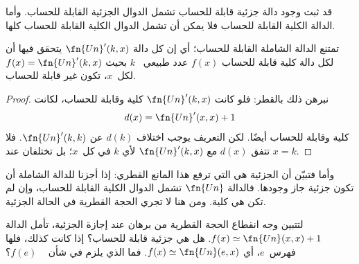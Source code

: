 \documentclass[../../../include/open-logic-section]{subfiles}
\begin{document}

قد ثبت وجود دالة جزئية قابلة للحساب تشمل الدوال الجزئية القابلة للحساب.
وأما الدالة الكلية القابلة للحساب فلا يمكن أن تشمل الدوال الكلية القابلة للحساب كلها.

\begin{thm}
تمتنع الدالة الشاملة القابلة للحساب؛ أي إن كل دالة
$\fn{Un}'(k,x)$ يتحقق فيها أن لكل دالة كلية قابلة للحساب $f(x)$ عدد طبيعي
~$k$ بحيث $f(x)=\fn{Un}'(k,x)$ لكل~$x$، تكون غير قابلة
للحساب.
\end{thm}

\begin{proof}
نبرهن ذلك بالقطر: فلو كانت $\fn{Un}'(k,x)$ كلية وقابلة للحساب،
لكانت
\[
d(x) = \fn{Un}'(x, x) + 1
\]
كلية وقابلة للحساب أيضًا. لكن التعريف يوجب اختلاف $d(k)$ عن
$\fn{Un}'(k,k)$. فلا تتفق $d(x)$ مع $\fn{Un}'(k,x)$ لأي
$k$ في كل~$x$؛ بل تختلفان عند $x=k$.
\end{proof}

\begin{explain}
وأما  فتبيّن أن الجزئية هي التي ترفع هذا
المانع القطري: إذا أجزنا للدالة الشاملة أن تكون جزئية جاز وجودها. فالدالة
$\fn{Un}$ تشمل الدوال الكلية القابلة للحساب، وإن لم تكن هي كلية. ومن هنا
لا تجري الحجة القطرية في الحالة الجزئية.
\end{explain}

\begin{prob}
  لتتبين وجه انقطاع الحجة القطرية من برهان  عند
  إجازة الجزئية، تأمل الدالة
  $f(x)\simeq\fn{Un}(x,x)+1$. هل هي جزئية قابلة للحساب؟ إذا كانت كذلك،
  فلها فهرس~$e$، أي $f(x)\simeq\fn{Un}(e,x)$. فما الذي يلزم في شأن
  ~ $f(e)$؟
\end{prob}
\end{document}
